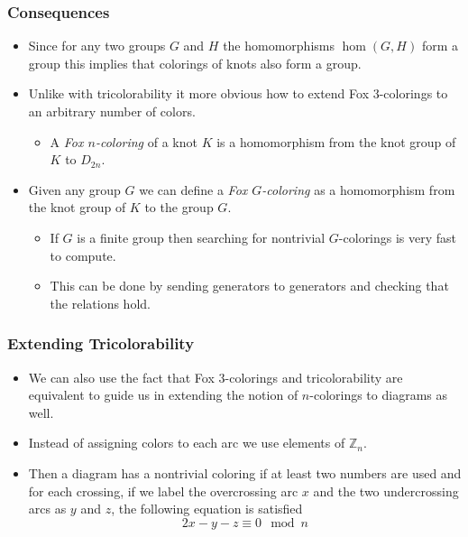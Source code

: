 \documentclass{beamer}
\begin{document}
\begin{frame}
  \frametitle{Consequences}
  \begin{itemize}
  \item Since for any two groups $G$ and $H$ the homomorphisms
    $\hom(G,H)$ form a group this implies that colorings of knots
    also form a group.
    \pause
  \item Unlike with tricolorability it more obvious how to extend
    Fox $3$-colorings to an arbitrary number of colors.
    \begin{itemize}
      \pause
    \item A \textit{Fox $n$-coloring} of a knot $K$ is a homomorphism from
      the knot group of $K$ to $D_{2n}$.
    \end{itemize}
    \pause
  \item Given any group $G$ we can define a \textit{Fox $G$-coloring}
    as a homomorphism from the knot group of $K$ to the group $G$.
    \begin{itemize}
      \pause
    \item If $G$ is a finite group then searching for nontrivial $G$-colorings
      is very fast to compute.
      \pause
    \item This can be done by sending generators to generators and checking
      that the relations hold.
    \end{itemize}
  \end{itemize}
\end{frame}

\begin{frame}
  \frametitle{Extending Tricolorability}
  \begin{itemize}
  \item We can also use the fact that Fox $3$-colorings and tricolorability
    are equivalent to guide us in extending the notion of $n$-colorings
    to diagrams as well.
    \pause
  \item Instead of assigning colors to each arc we use elements of $\mathbb{Z}_n$.
    \pause
  \item Then a diagram has a nontrivial coloring if at least two numbers are used
    and for each crossing, if we label the overcrossing arc $x$ and the two
    undercrossing arcs as $y$ and $z$, the following equation is satisfied
    \[
      2x-y-z \equiv 0 \mod n
    \]
  \end{itemize}
\end{frame}
\end{document}
